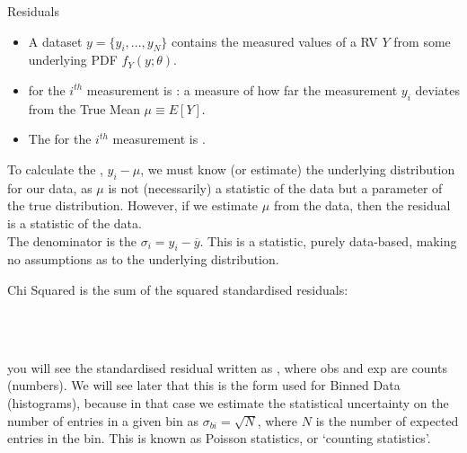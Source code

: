 \documentclass[10pt,sans,english,compress,xcolor=dvipsnames]{beamer}
\begin{document}
\begin{frame}{Residuals}
\footnotesize
\begin{itemize}
\item A dataset $y = \{y_i, ..., y_N \}$ contains the measured values of a RV $Y$ from some underlying PDF $f_Y(y;\theta)$.
\item {} for the $i^{th}$ measurement is : a measure of how far the measurement $y_i$ deviates from the True Mean $\mu\equiv E[Y]$.
\item The  for the $i^{th}$ measurement is .
\end{itemize}
\vspace{0.5cm}

To calculate the , $y_i - \mu$, we must know (or estimate) the underlying distribution for our data, as $\mu$ is not (necessarily) a statistic of the data but a parameter of the true distribution. However, if we estimate $\mu$ from the data, then the residual is a statistic of the data.\\[1ex]

The denominator is the  $\sigma_i = y_i - \overline{y}$. This is a statistic, purely data-based, making no assumptions as to the underlying distribution.\\[1ex]


\end{frame} 


\begin{frame}{Chi Squared}
\footnotesize
{} is  the sum of the squared standardised residuals:\\
\begin{center}
 \\[1ex]
\end{center}

\\[1ex]

 you will see the standardised residual written as , where obs and exp are  counts (numbers).  We will see later that this is the form used for Binned Data (histograms), because in that case we estimate the statistical uncertainty on the number of entries in a given bin as $\sigma_{bi} = \sqrt{N}$, where $N$ is the number of expected entries in the bin. This is known as Poisson statistics, or `counting statistics'.

\end{frame} 
\end{document}

